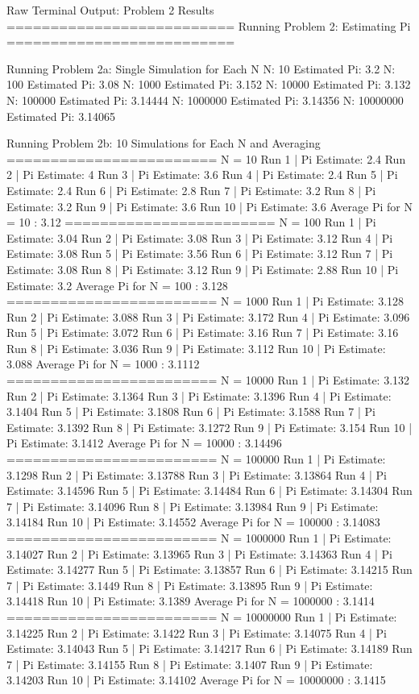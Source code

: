 \documentclass{article}
\begin{document}
\begin{outputbox}{Raw Terminal Output: Problem 2 Results}
    ==========================
Running Problem 2: Estimating Pi
==========================

Running Problem 2a: Single Simulation for Each N
N: 10 Estimated Pi: 3.2
N: 100 Estimated Pi: 3.08
N: 1000 Estimated Pi: 3.152
N: 10000 Estimated Pi: 3.132
N: 100000 Estimated Pi: 3.14444
N: 1000000 Estimated Pi: 3.14356
N: 10000000 Estimated Pi: 3.14065

Running Problem 2b: 10 Simulations for Each N and Averaging
========================
N = 10
Run 1 | Pi Estimate: 2.4
Run 2 | Pi Estimate: 4
Run 3 | Pi Estimate: 3.6
Run 4 | Pi Estimate: 2.4
Run 5 | Pi Estimate: 2.4
Run 6 | Pi Estimate: 2.8
Run 7 | Pi Estimate: 3.2
Run 8 | Pi Estimate: 3.2
Run 9 | Pi Estimate: 3.6
Run 10 | Pi Estimate: 3.6
Average Pi for N = 10 : 3.12
========================
N = 100
Run 1 | Pi Estimate: 3.04
Run 2 | Pi Estimate: 3.08
Run 3 | Pi Estimate: 3.12
Run 4 | Pi Estimate: 3.08
Run 5 | Pi Estimate: 3.56
Run 6 | Pi Estimate: 3.12
Run 7 | Pi Estimate: 3.08
Run 8 | Pi Estimate: 3.12
Run 9 | Pi Estimate: 2.88
Run 10 | Pi Estimate: 3.2
Average Pi for N = 100 : 3.128
========================
N = 1000
Run 1 | Pi Estimate: 3.128
Run 2 | Pi Estimate: 3.088
Run 3 | Pi Estimate: 3.172
Run 4 | Pi Estimate: 3.096
Run 5 | Pi Estimate: 3.072
Run 6 | Pi Estimate: 3.16
Run 7 | Pi Estimate: 3.16
Run 8 | Pi Estimate: 3.036
Run 9 | Pi Estimate: 3.112
Run 10 | Pi Estimate: 3.088
Average Pi for N = 1000 : 3.1112
========================
N = 10000
Run 1 | Pi Estimate: 3.132
Run 2 | Pi Estimate: 3.1364
Run 3 | Pi Estimate: 3.1396
Run 4 | Pi Estimate: 3.1404
Run 5 | Pi Estimate: 3.1808
Run 6 | Pi Estimate: 3.1588
Run 7 | Pi Estimate: 3.1392
Run 8 | Pi Estimate: 3.1272
Run 9 | Pi Estimate: 3.154
Run 10 | Pi Estimate: 3.1412
Average Pi for N = 10000 : 3.14496
========================
N = 100000
Run 1 | Pi Estimate: 3.1298
Run 2 | Pi Estimate: 3.13788
Run 3 | Pi Estimate: 3.13864
Run 4 | Pi Estimate: 3.14596
Run 5 | Pi Estimate: 3.14484
Run 6 | Pi Estimate: 3.14304
Run 7 | Pi Estimate: 3.14096
Run 8 | Pi Estimate: 3.13984
Run 9 | Pi Estimate: 3.14184
Run 10 | Pi Estimate: 3.14552
Average Pi for N = 100000 : 3.14083
========================
N = 1000000
Run 1 | Pi Estimate: 3.14027
Run 2 | Pi Estimate: 3.13965
Run 3 | Pi Estimate: 3.14363
Run 4 | Pi Estimate: 3.14277
Run 5 | Pi Estimate: 3.13857
Run 6 | Pi Estimate: 3.14215
Run 7 | Pi Estimate: 3.1449
Run 8 | Pi Estimate: 3.13895
Run 9 | Pi Estimate: 3.14418
Run 10 | Pi Estimate: 3.1389
Average Pi for N = 1000000 : 3.1414
========================
N = 10000000
Run 1 | Pi Estimate: 3.14225
Run 2 | Pi Estimate: 3.1422
Run 3 | Pi Estimate: 3.14075
Run 4 | Pi Estimate: 3.14043
Run 5 | Pi Estimate: 3.14217
Run 6 | Pi Estimate: 3.14189
Run 7 | Pi Estimate: 3.14155
Run 8 | Pi Estimate: 3.1407
Run 9 | Pi Estimate: 3.14203
Run 10 | Pi Estimate: 3.14102
Average Pi for N = 10000000 : 3.1415


\end{outputbox}
\end{document}
